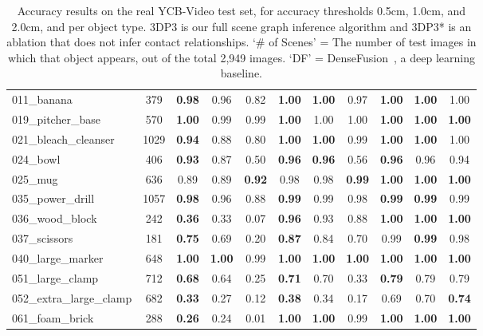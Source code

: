 \begin{table}[]
\begin{tabular}{@{}lc|ccc|ccc|ccc@{}}
		011\_banana & 379 &\textbf{0.98}  & 0.96  & 0.82  & \textbf{1.00}  & \textbf{1.00}  & 0.97  & \textbf{1.00}  & \textbf{1.00}  & 1.00 \\  
		019\_pitcher\_base & 570 &\textbf{1.00}  & 0.99  & 0.99  & \textbf{1.00}  & 1.00  & 1.00  & \textbf{1.00}  & \textbf{1.00}  & \textbf{1.00} \\  
		021\_bleach\_cleanser & 1029 &\textbf{0.94}  & 0.88  & 0.80  & \textbf{1.00}  & \textbf{1.00}  & 0.99  & \textbf{1.00}  & \textbf{1.00}  & 1.00 \\  
		024\_bowl & 406 &\textbf{0.93}  & 0.87  & 0.50  & \textbf{0.96}  & \textbf{0.96}  & 0.56  & \textbf{0.96}  & 0.96  & 0.94 \\  
		025\_mug & 636 &0.89  & 0.89  & \textbf{0.92}  & 0.98  & 0.98  & \textbf{0.99}  & \textbf{1.00}  & \textbf{1.00}  & \textbf{1.00} \\  
		035\_power\_drill & 1057 &\textbf{0.98}  & 0.96  & 0.88  & \textbf{0.99}  & 0.99  & 0.98  & \textbf{0.99}  & \textbf{0.99}  & 0.99 \\  
		036\_wood\_block & 242 &\textbf{0.36}  & 0.33  & 0.07  & \textbf{0.96}  & 0.93  & 0.88  & \textbf{1.00}  & \textbf{1.00}  & \textbf{1.00} \\  
		037\_scissors & 181 &\textbf{0.75}  & 0.69  & 0.20  & \textbf{0.87}  & 0.84  & 0.70  & 0.99  & \textbf{0.99}  & 0.98 \\  
		040\_large\_marker & 648 &\textbf{1.00}  & \textbf{1.00}  & 0.99  & \textbf{1.00}  & \textbf{1.00}  & \textbf{1.00}  & \textbf{1.00}  & \textbf{1.00}  & \textbf{1.00} \\  
		051\_large\_clamp & 712 &\textbf{0.68}  & 0.64  & 0.25  & \textbf{0.71}  & 0.70  & 0.33  & \textbf{0.79}  & 0.79  & 0.79 \\  
		052\_extra\_large\_clamp & 682 &\textbf{0.33}  & 0.27  & 0.12  & \textbf{0.38}  & 0.34  & 0.17  & 0.69  & 0.70  & \textbf{0.74} \\  
		061\_foam\_brick & 288 &\textbf{0.26}  & 0.24  & 0.01  & \textbf{1.00}  & \textbf{1.00}  & 0.99  & \textbf{1.00}  & \textbf{1.00}  & \textbf{1.00} \\   
		\bottomrule
		
	\end{tabular}
	\caption{%
Accuracy results on the real YCB-Video test set, for accuracy thresholds 0.5cm, 1.0cm, and 2.0cm, and per object type.
3DP3 is our full scene graph inference algorithm and 3DP3* is an ablation that does not infer contact relationships.
`\# of Scenes' = The number of test images in which that object appears, out of the total 2,949 images.
`DF' = DenseFusion~\cite{wang2019densefusion}, a deep learning baseline.
}
	\label{tab:full_ycb}
\end{table}

